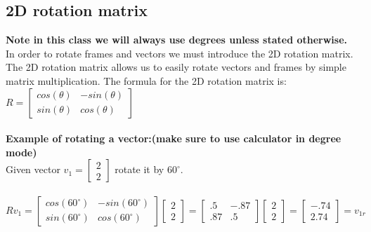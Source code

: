 \documentclass{article}
\begin{document}
\subsection{2D rotation matrix}
\textbf{Note in this class we will always use degrees unless stated otherwise.}\\
In order to rotate frames and vectors we must introduce the 2D rotation matrix. The 2D rotation matrix allows us to easily rotate vectors and frames by simple matrix multiplication. The formula for the 2D rotation matrix is:\\
$R=\begin{bmatrix}
cos(\theta) & -sin(\theta) \\
sin(\theta) & cos(\theta)
\end{bmatrix}$ \\\\
\textbf{Example of rotating a vector:(make sure to use calculator in degree mode)}\\
Given vector $v_1 = \begin{bmatrix}
2 \\
2
\end{bmatrix}$ rotate it by $60^\circ$.\\\\
$Rv_1=\begin{bmatrix}
cos(60^\circ) & -sin(60^\circ) \\
sin(60^\circ) & cos(60^\circ)
\end{bmatrix}
\begin{bmatrix}
2 \\
2
\end{bmatrix}=
\begin{bmatrix}
.5 & -.87 \\
.87 & .5
\end{bmatrix}
\begin{bmatrix}
2 \\
2
\end{bmatrix}=
\begin{bmatrix}
-.74 \\
2.74
\end{bmatrix}=v_{1r}$\\\\
\end{document}
